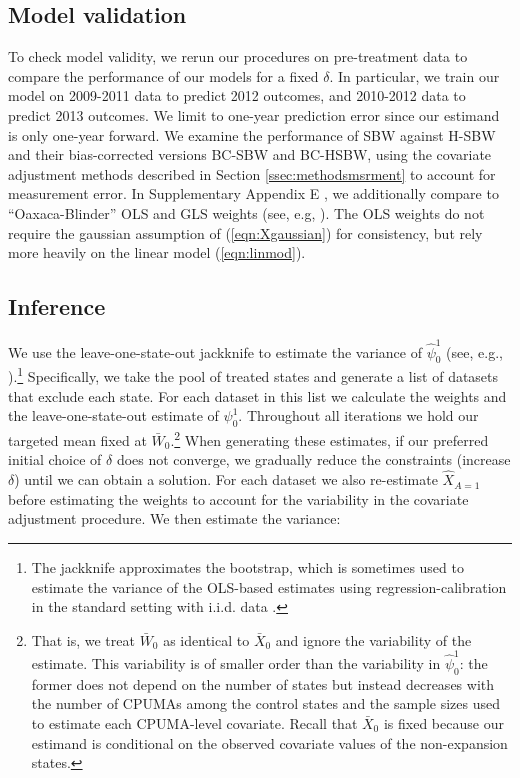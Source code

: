 \documentclass[aoas]{imsart}
\theoremstyle{plain}
\theoremstyle{remark}
\begin{document}
\subsection{Model validation}

To check model validity, we rerun our procedures on pre-treatment data to compare the performance of our models for a fixed $\delta$. In particular, we train our model on 2009-2011 data to predict 2012 outcomes, and 2010-2012 data to predict 2013 outcomes. We limit to one-year prediction error since our estimand is only one-year forward. We examine the performance of SBW against H-SBW and their bias-corrected versions BC-SBW and BC-HSBW, using the covariate adjustment methods described in Section \ref{ssec:methodsmsrment} to account for measurement error. In Supplementary Appendix E \citep{supplement}, we additionally compare to ``Oaxaca-Blinder'' OLS and GLS weights (see, e.g, \cite{kline2011oaxaca}). The OLS weights do not require the gaussian assumption of (\ref{eqn:Xgaussian}) for consistency, but rely more heavily on the linear model (\ref{eqn:linmod}).

\subsection{Inference}

We use the leave-one-state-out jackknife to estimate the variance of $\hat{\psi}_0^1$ (see, e.g., \citet{cameron2015practitioner}).\footnote{The jackknife approximates the bootstrap, which is sometimes used to estimate the variance of the OLS-based estimates using regression-calibration in the standard setting with i.i.d. data \citep{carroll2006measurement}.} Specifically, we take the pool of treated states and generate a list of datasets that exclude each state. For each dataset in this list we calculate the weights and the leave-one-state-out estimate of $\psi_0^1$. Throughout all iterations we hold our targeted mean fixed at $\bar{W}_0$.\footnote{That is, we treat $\bar{W}_0$ as identical to $\bar{X}_0$ and ignore the variability of the estimate. This variability is of smaller order than the variability in $\hat{\psi}_0^1$: the former does not depend on the number of states but instead decreases with the number of CPUMAs among the control states and the sample sizes used to estimate each CPUMA-level covariate. Recall that $\bar{X}_0$ is fixed because our estimand is conditional on the observed covariate values of the non-expansion states.} When generating these estimates, if our preferred initial choice of $\delta$ does not converge, we gradually reduce the constraints (increase $\delta$) until we can obtain a solution. For each dataset we also re-estimate $\hat{X}_{A=1}$ before estimating the weights to account for the variability in the covariate adjustment procedure. We then estimate the variance:
\end{document}
